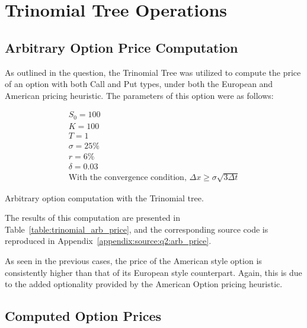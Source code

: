 \documentclass[10pt]{article}
\begin{document}
    \newpage
    \section{Trinomial Tree Operations}
    
        \subsection{Arbitrary Option Price Computation}

        As outlined in the question, the Trinomial Tree was utilized to compute the price of an option with both Call and Put types, under both the European and American pricing heuristic. The parameters of this option were as follows:

        \begin{gather*}
            S_0 = 100 \\
            K = 100 \\
            T = 1 \\
            \sigma = 25\% \\
            r = 6\% \\
            \delta = 0.03 \\
            \text{With the convergence condition, } \Delta x \geq \sigma \sqrt{3 \Delta t}
        \end{gather*}

        \begin{table}[!h]
            \centering
            \caption{Arbitrary option computation with the Trinomial tree.}
            \label{table:trinomial_arb_price}
        \end{table}
    

        The results of this computation are presented in Table~\ref{table:trinomial_arb_price}, and the corresponding source code is reproduced in Appendix~\ref{appendix:source:q2:arb_price}.

        As seen in the previous cases, the price of the American style option is consistently higher than that of its European style counterpart. Again, this is due to the added optionality provided by the American Option pricing heuristic.

        \newpage
        \subsection{Computed Option Prices}
    
\end{document}
